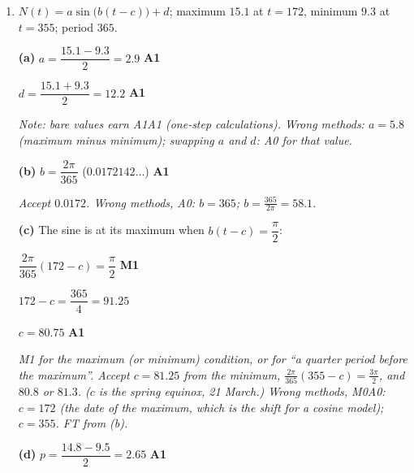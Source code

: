 \documentclass[12pt, twoside]{article}
\begin{document}
\begin{enumerate}[itemsep=0.3cm]
$\text{Area } ABCD = 85.4\,\text{cm}^{2}$ \quad ($85.4440\ldots$)
\hfill \textbf{A1}

\emph{First M1 for a correct area expression for either triangle (two sides
and the angle between them; for $ACD$ that is $57^\circ$ between $AC$ and
$AD$). Second M1 for adding the two areas. Accept any value consistent with
the candidate's rounded $AC$ and $AD$, e.g.\ $86.1$ from $13.2$ and
$10.2$. Wrong method: using $110^\circ$ in triangle $ACD$ gives $92.2$:
M1M1A0. FT from (a) and (b).}

\emph{Feedback: store full values in the calculator; rounding $AC$ early
moves the area by almost a whole square centimetre.}

\newpage

\item[4.] [Maximum mark: 12]

$N(t) = a\sin\bigl(b(t - c)\bigr) + d$; maximum $15.1$ at $t = 172$,
minimum $9.3$ at $t = 355$; period $365$.

\textbf{(a)} $a = \dfrac{15.1 - 9.3}{2} = 2.9$ \hfill \textbf{A1}

$d = \dfrac{15.1 + 9.3}{2} = 12.2$ \hfill \textbf{A1}

\emph{Note: bare values earn A1A1 (one-step calculations). Wrong methods:
$a = 5.8$ (maximum minus minimum); swapping $a$ and $d$: A0 for that
value.}

\textbf{(b)} $b = \dfrac{2\pi}{365}$ \quad ($0.0172142\ldots$) \hfill \textbf{A1}

\emph{Accept $0.0172$. Wrong methods, A0: $b = 365$; $b = \frac{365}{2\pi}
= 58.1$.}

\textbf{(c)} The sine is at its maximum when $b(t - c) = \dfrac{\pi}{2}$:

$\dfrac{2\pi}{365}(172 - c) = \dfrac{\pi}{2}$ \hfill \textbf{M1}

$172 - c = \dfrac{365}{4} = 91.25$

$c = 80.75$ \hfill \textbf{A1}

\emph{M1 for the maximum (or minimum) condition, or for ``a quarter period
before the maximum''. Accept $c = 81.25$ from the minimum,
$\frac{2\pi}{365}(355 - c) = \frac{3\pi}{2}$, and $80.8$ or $81.3$.
($c$ is the spring equinox, 21 March.) Wrong methods, M0A0: $c = 172$ (the
date of the maximum, which is the shift for a cosine model); $c = 355$.
FT from (b).}

\textbf{(d)} $p = \dfrac{14.8 - 9.5}{2} = 2.65$ \hfill \textbf{A1}


\end{enumerate}
\end{document}
